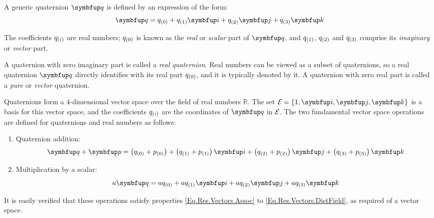 A generic quaternion $\quat{q}$ is defined by an expression of the form:
\begin{equation} \label{E:Quat:Def:Quat}
\quat{q} = \qcmp{q}{0} + \qcmp{q}{1} \qi + \qcmp{q}{2} \qj + \qcmp{q}{3} \qk
\end{equation}

The coefficients ${q}_{(i)}$ are real numbers; ${q}_{(0)}$ is known as the \emph{real} or \emph{scalar} part of $\quat{q}$, and ${q}_{(1)}$, ${q}_{(2)}$ and ${q}_{(3)}$ comprise its \emph{imaginary} or \emph{vector} part.

A quaternion with zero imaginary part is called a \emph{real quaternion}. Real numbers can be viewed as a subset of quaternions, so a real quaternion $\quat{q}$ directly identifies with its real part ${q}_{(0)}$, and it is typically denoted by it. A quaternion with zero real part is called a \emph{pure} or \emph{vector} quaternion.

Quaternions form a $4$-dimensional vector space over the field of real numbers $\mathbb{R}$. The set $\basis=\left\{ 1,\qi,\qj,\qk \right\}$ is a basis for this vector space, and the coefficients ${q}_{(i)}$ are the coordinates of $\quat{q}$ in $\mathcal{E}_{ }$. The two fundamental vector space operations are defined for quaternions and real numbers as follows:
\begin{enumerate}
	\item Quaternion addition:
		\begin{equation*}
		\quat{q} + \quat{p} = \left( \qcmp{q}{0}+\qcmp{p}{0} \right) + \left( \qcmp{q}{1}+\qcmp{p}{1} \right)\qi + \left( \qcmp{q}{2}+\qcmp{p}{2} \right)\qj + \left( \qcmp{q}{3}+\qcmp{p}{3} \right)\qk %
		\end{equation*}
	\item Multiplication by a scalar:
		\begin{equation*}
		a\quat{q} = a\qcmp{q}{0}+a\qcmp{q}{1}\qi + a\qcmp{q}{2}\qj + a\qcmp{q}{3} \qk %
		\end{equation*}
\end{enumerate}

It is easily verified that these operations satisfy properties \eqref{Eq.Res.Vectors.Assoc} to \eqref{Eq.Res.Vectors.DistField}, as required of a vector space.

